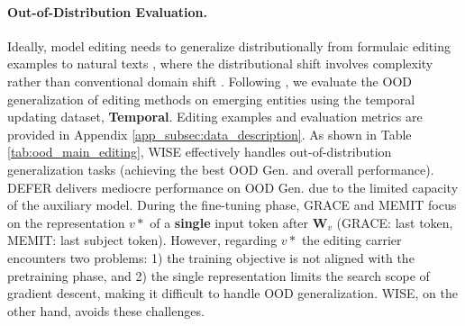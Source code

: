 \documentclass{article}
\begin{document}
\paragraph{Out-of-Distribution Evaluation.} 
Ideally, model editing needs to generalize distributionally from formulaic editing examples to natural texts \cite{canonical_examples}, where the distributional shift involves complexity rather than conventional domain shift \cite{domain_shift}.
Following \citep{canonical_examples}, we evaluate the OOD generalization of editing methods on emerging entities using the temporal updating dataset, \textbf{Temporal}. 
Editing examples and evaluation metrics are provided in Appendix \ref{app_subsec:data_description}.
As shown in Table \ref{tab:ood_main_editing}, WISE effectively handles out-of-distribution generalization tasks (achieving the best OOD Gen. and overall performance).
DEFER delivers mediocre performance on OOD Gen. due to the limited capacity of the auxiliary model\cite{knowledge_editing_survey_1}.
During the fine-tuning phase, GRACE and MEMIT focus on the representation $v*$ of a \textbf{single} input token after $\mathbf{W}_v$ (GRACE: last token, MEMIT: last subject token).
However, regarding $v*$ the editing carrier encounters two problems: 1) the training objective is not aligned with the pretraining phase, and 2) the single representation limits the search scope of gradient descent, making it difficult to handle OOD generalization. WISE, on the other hand, avoids these challenges.


\end{document}
